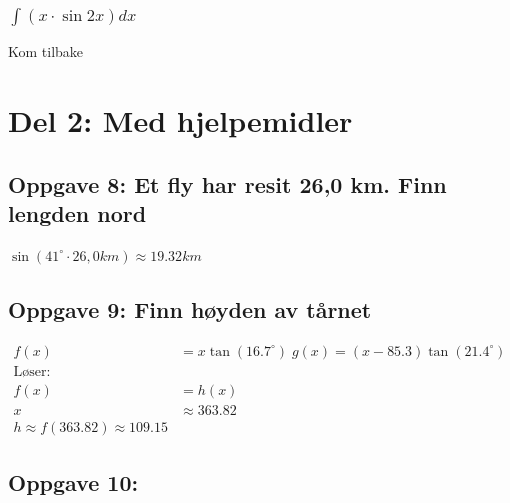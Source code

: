 \documentclass{article}
\begin{document}
\subsubsection{$\int (x \cdot \sin 2x)dx$}

Kom tilbake

\section{Del 2: Med hjelpemidler}

\subsection{Oppgave 8: Et fly har resit 26,0 km. Finn lengden nord}

$\sin(41^{\circ} \cdot 26,0km) \approx 19.32 km$


\subsection{Oppgave 9: Finn høyden av tårnet}


\begin{align*}
    f(x) &= x\tan(16.7^\circ) \; g(x)=(x-85.3)\tan(21.4^\circ) \\
    \text{Løser:} \\
    f(x) &= h(x) \\
    x &\approx 363.82 \\
    h \approx f(363.82) \approx 109.15 
\end{align*}


\subsection{Oppgave 10: }
\end{document}
